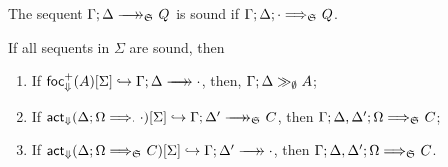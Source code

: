 \begin{definition}
  The sequent $\zfneuseq{\Gamma}{\Delta}{\ctrlset{}}{Q}$ is sound if
  $\Gamma; \Delta; \cdot \Longrightarrow_{\mathfrak{S}_{}} Q$.
\end{definition}

\begin{lemma}\label{fsoundnesslemma}
  If all sequents in $\Sigma$ are sound, then

  \begin{enumerate}
  \item If $\relj{\frfrel{A}}{\Sigma}{\zfneuseqempty{\Gamma}{\Delta}}$,
    then, $\Gamma; \Delta \gg_{\emptyset} A$;
  \item If
    $\relj{\factrel{\zsyseq{\Delta}{\Omega}{\cdot}{\cdot}}}{\Sigma}
    {\zfneuseq{\Gamma}{\Delta'}{\ctrlset{}}{C}}$, then
    $\Gamma; \Delta, \Delta'; \Omega \Longrightarrow_{\mathfrak{S}_{}} C$;
  \item If
    $\relj{\factrel{\zsyseq{\Delta}{\Omega}{\ctrlset{}}{C}}}{\Sigma}
    {\zfneuseqempty{\Gamma}{\Delta'}}$, then
    $\Gamma; \Delta, \Delta'; \Omega \Longrightarrow_{\mathfrak{S}_{}} C$.
  \end{enumerate}
\end{lemma}
